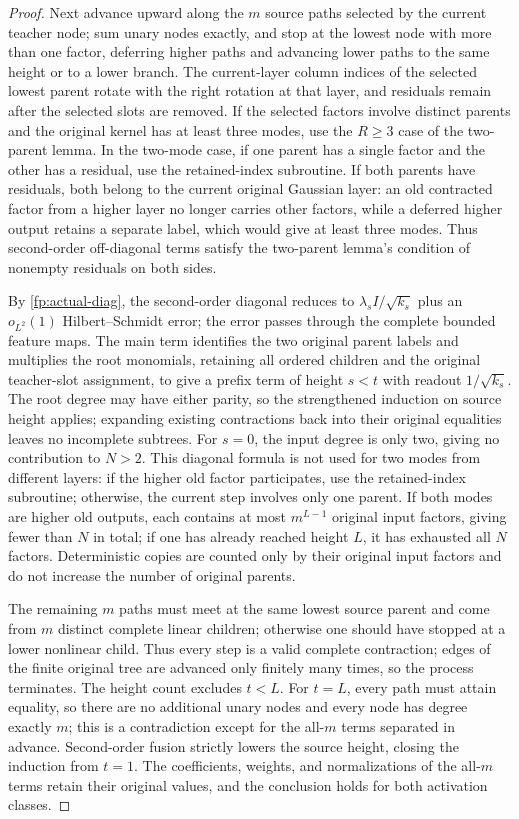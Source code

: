 \documentclass[a4paper]{tufte-handout}
\begin{document}
\begin{fullwidth}
\begin{proof}
Next advance upward along the $m$ source paths selected by the current teacher node; sum unary nodes exactly,
and stop at the lowest node with more than one factor, deferring higher paths and advancing lower paths to the same height or to a lower branch.
The current-layer column indices of the selected lowest parent rotate with the right rotation at that layer, and residuals remain after the selected slots are removed.
If the selected factors involve distinct parents and the original kernel has at least three modes, use the $R\ge3$ case of the two-parent lemma.
In the two-mode case, if one parent has a single factor and the other has a residual, use the retained-index subroutine.
If both parents have residuals, both belong to the current original Gaussian layer: an old contracted factor from a higher layer no longer carries other factors,
while a deferred higher output retains a separate label, which would give at least three modes.
Thus second-order off-diagonal terms satisfy the two-parent lemma's condition of nonempty residuals on both sides.

By \eqref{fp:actual-diag}, the second-order diagonal reduces to
$\lambda_sI/\sqrt{k_s}$ plus an $o_{L^2}(1)$ Hilbert--Schmidt error;
the error passes through the complete bounded feature maps. The main term identifies the two original parent labels and multiplies the root monomials,
retaining all ordered children and the original teacher-slot assignment, to give a prefix term of height $s<t$ with readout $1/\sqrt{k_s}$.
The root degree may have either parity, so the strengthened induction on source height applies; expanding existing contractions back into their original equalities leaves no incomplete subtrees.
For $s=0$, the input degree is only two, giving no contribution to $N>2$.
This diagonal formula is not used for two modes from different layers: if the higher old factor participates, use the retained-index subroutine;
otherwise, the current step involves only one parent. If both modes are higher old outputs, each contains at most
$m^{L-1}$ original input factors, giving fewer than $N$ in total; if one has already reached height $L$, it has exhausted all $N$ factors.
Deterministic copies are counted only by their original input factors and do not increase the number of original parents.

The remaining $m$ paths must meet at the same lowest source parent and come from
$m$ distinct complete linear children; otherwise one should have stopped at a lower nonlinear child.
Thus every step is a valid complete contraction; edges of the finite original tree are advanced only finitely many times, so the process terminates.
The height count excludes $t<L$. For $t=L$, every path must attain equality, so there are no additional unary nodes and every node has degree exactly $m$;
this is a contradiction except for the all-$m$ terms separated in advance. Second-order fusion strictly lowers the source height, closing the induction from $t=1$.
The coefficients, weights, and normalizations of the all-$m$ terms retain their original values, and the conclusion holds for both activation classes.
\end{proof}



\end{fullwidth}
\end{document}
